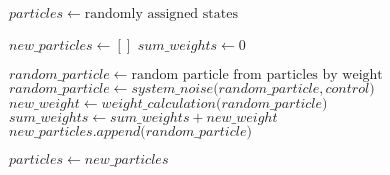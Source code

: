 
  \Input
  \EndInput

\State $particles \gets \text{randomly assigned states}$

	\State $new\_particles \gets []$
	\State $sum\_weights \gets 0$

	    \State $random\_particle \gets \text{random particle from particles by weight}$
	    \State $random\_particle \gets system\_noise\text{(}random\_particle, control\text{)}$
	    \State $new\_weight \gets weight\_calculation\text{(}random\_particle\text{)}$
	    \State $sum\_weights \gets sum\_weights + new\_weight$
	    \State $new\_particles.append\text{(}random\_particle\text{)}$
    \EndFor
    
    \State $particles \gets new\_particles$
\EndWhile
\EndProcedure